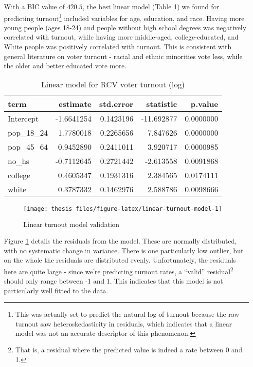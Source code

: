 \documentclass[12pt,twoside]{reedthesis}
\begin{document}
With a BIC value of \(420.5\), the best linear model (Table \ref{tab:linear-turnout-model}) we found for predicting turnout\footnote{This was actually set to predict the natural log of turnout because the raw turnout saw heteroskedasticity in residuals, which indicates that a linear model was not an accurate descriptor of this phenomenon.} included variables for age, education, and race. Having more young people (ages 18-24) and people without high school degrees was negatively correlated with turnout, while having more middle-aged, college-educated, and White people was positively correlated with turnout. This is consistent with general literature on voter turnout - racial and ethnic minorities vote less, while the older and better educated vote more.
\begin{table}[t]

\caption[Linear turnout model]{\label{tab:linear-turnout-model}Linear model for RCV voter turnout (log)}
\centering
\begin{tabular}{lrrrr}
\toprule
term & estimate & std.error & statistic & p.value\\
\midrule
Intercept & -1.6641254 & 0.1423196 & -11.692877 & 0.0000000\\
pop\_18\_24 & -1.7780018 & 0.2265656 & -7.847626 & 0.0000000\\
pop\_45\_64 & 0.9452890 & 0.2411011 & 3.920717 & 0.0000985\\
no\_hs & -0.7112645 & 0.2721442 & -2.613558 & 0.0091868\\
college & 0.4605347 & 0.1931316 & 2.384565 & 0.0174111\\
\addlinespace
white & 0.3787332 & 0.1462976 & 2.588786 & 0.0098666\\
\bottomrule
\end{tabular}
\end{table}
\begin{figure}
\texttt{[image: thesis\_files/figure-latex/linear-turnout-model-1]} \caption{Linear turnout model validation}\label{fig:linear-turnout-model}
\end{figure}
Figure \ref{fig:linear-turnout-model} details the residuals from the model. These are normally distributed, with no systematic change in variance. There is one particularly low outlier, but on the whole the residuals are distributed evenly. Unfortunately, the residuals here are quite large - since we're predicting turnout rates, a ``valid'' residual\footnote{That is, a residual where the predicted value is indeed a rate between 0 and 1.} should only range between -1 and 1. This indicates that this model is not particularly well fitted to the data.
\end{document}
